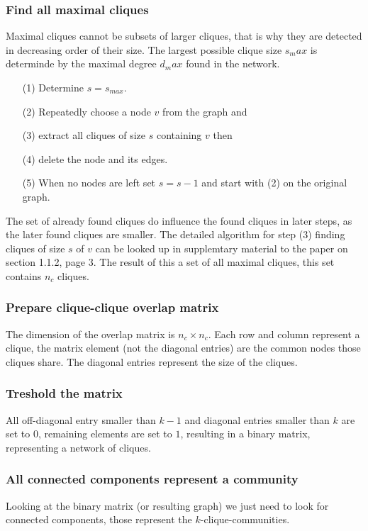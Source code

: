 \documentclass[runningheads,a4paper]{llncs}
\begin{document}
\subsubsection{Find all maximal cliques}
Maximal cliques cannot be subsets of larger cliques, that is why they are detected in decreasing order of their size. The largest possible clique size $s_max$ is determinde by the maximal degree $d_max$ found in the network.

\begin{enumerate}
\item[(1)] Determine $s=s_{max}$.
\item[(2)] Repeatedly choose a node $v$ from the graph and
\item[(3)] extract all cliques of size $s$ containing $v$ then
\item[(4)] delete the node and its edges.
\item[(5)] When no nodes are left set $s=s-1$ and start with (2) on the original graph.
\end{enumerate}

The set of already found cliques do influence the found cliques in later steps, as the later found cliques are smaller. The detailed algorithm for step (3) finding cliques of size $s$ of $v$ can be looked up in supplemtary material to the paper on section 1.1.2, page 3. The result of this a set of all maximal cliques, this set contains $n_c$ cliques.

\subsubsection{Prepare clique-clique overlap matrix}
The dimension of the overlap matrix is $n_c \times n_c$. Each row and column represent a clique, the matrix element (not the diagonal entries) are the common nodes those cliques share. The diagonal entries represent the size of the cliques.

\subsubsection{Treshold the matrix}
All off-diagonal entry smaller than $k-1$ and diagonal entries smaller than $k$ are set to $0$, remaining elements are set to $1$, resulting in a binary matrix, representing a network of cliques.
 
\subsubsection{All connected components represent a community}
Looking at the binary matrix (or resulting graph) we just need to look for connected components, those represent the $k$-clique-communities.
\end{document}
